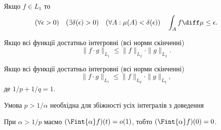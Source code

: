 \begin{reminder}
    \nothing
    \begin{proposition}
        Якщо $f \in L_1$ то
        \begin{equation}
            (\forall \epsilon > 0) \quad (\exists \delta(\epsilon) > 0) \quad (\forall A: \mu(A) < \delta(\epsilon)) \quad \int_A f \diff \mu \le \epsilon.
        \end{equation}
    \end{proposition}

    \begin{th_inequality}
        Якщо всі функції достатньо інтегровні (всі норми скінченні)
        \begin{equation}
            \|f \cdot g\|_{L_1} \le \|f\|_{L_2} \cdot \|g\|_{L_2}.  
        \end{equation}
    \end{th_inequality}
    
    \begin{th_inequality}
        Якщо всі функції достатньо інтегровні (всі норми скінченні)
        \begin{equation}
            \|f \cdot g\|_{L_1} \le \|f\|_{L_p} \cdot \|g\|_{L_q},  
        \end{equation}
        де $1 / p + 1 / q = 1$.
    \end{th_inequality}
\end{reminder}

\begin{remark}
    Умова $p > 1 / \alpha$ необхідна для збіжності усіх інтегралів з доведення
\end{remark}

\begin{corollary}
    При $\alpha > 1 / p$ маємо $(\Fint{\alpha} f)(t) = o(1)$, тобто $(\Fint{\alpha} f)(0) = 0$.
\end{corollary}


